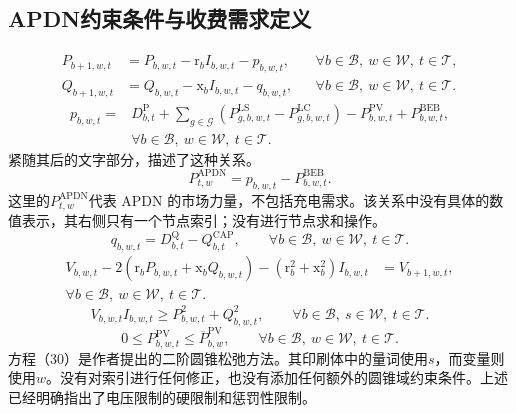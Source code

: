 \documentclass{article}
\begin{document}
\subsection*{APDN约束条件与收费需求定义}
\begin{align}
P_{b+1,w,t}&=P_{b,w,t}-\mathrm r_b I_{b,w,t}-p_{b,w,t},
&&\forall b\in\mathcal B,\ w\in\mathcal W,\ t\in\mathcal T,\tag{25}\\
Q_{b+1,w,t}&=Q_{b,w,t}-\mathrm x_b I_{b,w,t}-q_{b,w,t},
&&\forall b\in\mathcal B,\ w\in\mathcal W,\ t\in\mathcal T.\tag{26}
\end{align}
\begin{equation}
\begin{aligned}
p_{b,w,t}={}&D^{\mathrm P}_{b,t}
+\sum_{g\in\mathcal G}(P^{\mathrm{LS}}_{g,b,w,t}-P^{\mathrm{LC}}_{g,b,w,t})
-P^{\mathrm{PV}}_{b,w,t}+P^{\mathrm{BEB}}_{b,w,t},\\
&\forall b\in\mathcal B,\ w\in\mathcal W,\ t\in\mathcal T.
\end{aligned}\tag{27}
\end{equation}
紧随其后的文字部分，描述了这种关系。
\[
P^{\mathrm{APDN}}_{t,w}=p_{b,w,t}-P^{\mathrm{BEB}}_{b,w,t}.
\]
这里的\(P^{\mathrm{APDN}}_{t,w}\)代表 APDN 的市场力量，不包括充电需求。该关系中没有具体的数值表示，其右侧只有一个节点索引；没有进行节点求和操作。
\begin{equation}
q_{b,w,t}=D^{\mathrm Q}_{b,t}-Q^{\mathrm{CAP}}_{b,t},
\qquad\forall b\in\mathcal B,\ w\in\mathcal W,\ t\in\mathcal T.
\tag{28}
\end{equation}
\begin{equation}
\begin{aligned}
V_{b,w,t}-2(\mathrm r_bP_{b,w,t}+\mathrm x_bQ_{b,w,t})
-(\mathrm r_b^2+\mathrm x_b^2)I_{b,w,t}&=V_{b+1,w,t},\\
\forall b\in\mathcal B,\ w\in\mathcal W,\ t\in\mathcal T.&
\end{aligned}\tag{29}
\end{equation}
\begin{equation}
V_{b,w,t}I_{b,w,t}\geq P_{b,w,t}^2+Q_{b,w,t}^2,
\qquad\forall b\in\mathcal B,\ s\in\mathcal W,\ t\in\mathcal T.
\tag{30}
\end{equation}
\begin{equation}
0\leq P^{\mathrm{PV}}_{b,w,t}\leq\overline P^{\mathrm{PV}}_{b,w},
\qquad\forall b\in\mathcal B,\ w\in\mathcal W,\ t\in\mathcal T.
\tag{32}
\end{equation}
方程（30）是作者提出的二阶圆锥松弛方法。其印刷体中的量词使用\(s\)，而变量则使用\(w\)。没有对索引进行任何修正，也没有添加任何额外的圆锥域约束条件。上述已经明确指出了电压限制的硬限制和惩罚性限制。
\end{document}
